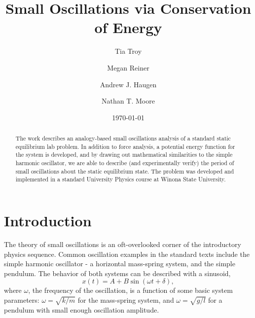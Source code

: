 \documentclass[12pt]{iopart}
\newcommand{\be}{\begin{equation}}
\newcommand{\ee}{\end{equation}}
\begin{document}
\title{Small Oscillations via Conservation of Energy}

\author{Tia Troy}
\author{Megan Reiner}
\author{Andrew J. Haugen}
\author{Nathan T. Moore}
\address{Department of Physics, Winona State University, Winona, MN 55987}


\vspace{10pt}


\date{\today}

\begin{abstract}
The work describes an analogy-based small oscillations analysis of a standard static equilibrium lab problem.  In addition to force analysis, a potential energy function for the system is developed, and by drawing out mathematical similarities to the simple harmonic oscillator, we are able to describe (and experimentally verify) the period of small oscillations about the static equilibrium state.  The problem was developed and implemented in a standard University Physics course at Winona State University.
\end{abstract}

%
%
\submitto{\PED}
%
% 
%








\section{Introduction} 
The theory of small oscillations is an oft-overlooked corner of the introductory physics sequence.  Common oscillation examples in the standard texts include the simple harmonic oscillator - a horizontal mass-spring system, and the simple pendulum.  The behavior of both systems can be described with a sinusoid,
\be x(t)=A+B\sin\left(\omega t + \delta \right),
\ee
where $\omega$, the frequency of the oscillation, is a function of some basic system parameters: $\omega=\sqrt{k/m}$ for the mass-spring system, and $\omega=\sqrt{g/l}$ for a pendulum with small enough oscillation amplitude.  
\end{document}
